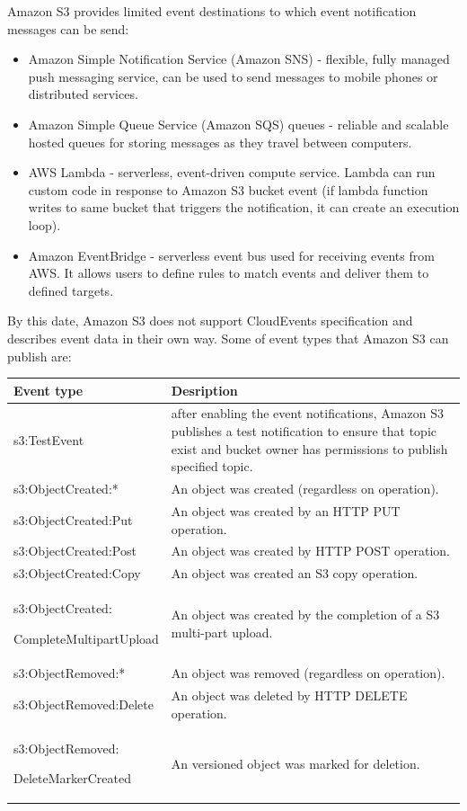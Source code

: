      Amazon S3 provides limited event destinations to which event notification messages can be send\cite{eventS3EventNotificationDest}:
     \begin{itemize}
         \item Amazon Simple Notification Service (Amazon SNS) - flexible, fully managed push messaging service, can be used to send messages to mobile phones or distributed services.
         \item Amazon Simple Queue Service (Amazon SQS) queues - reliable and scalable hosted queues for storing messages as they travel between computers.
         \item AWS Lambda - serverless, event-driven compute service. Lambda can run custom code in response to Amazon S3 bucket event (if lambda function writes to same bucket that triggers the notification, it can create an execution loop).
         \item Amazon EventBridge - serverless event bus used for receiving events from AWS. It allows users to define rules to match events and deliver them to defined targets.
     \end{itemize}

     By this date, Amazon S3 does not support CloudEvents specification and describes event data in their own way. Some of event types that Amazon S3 can publish are\cite{eventS3EventNotificationDest}:


     \renewcommand*{\arraystretch}{1.4}
     \begin{tabularx}{\textwidth}{|p{}|X|}
         \hline
         \textbf{Event type} & \textbf{Desription} \\
         \hline
         s3:TestEvent & after enabling the event notifications, Amazon S3 publishes a test notification to ensure that topic exist and bucket owner has permissions to publish specified topic. \\
         \hline
         s3:ObjectCreated:* & An object was created (regardless on operation). \\
         \hline
         s3:ObjectCreated:Put & An object was created by an HTTP PUT operation. \\
         \hline
         s3:ObjectCreated:Post & An object was created by HTTP POST operation. \\
         \hline
         s3:ObjectCreated:Copy & An object was created an S3 copy operation. \\
         \hline
         s3:ObjectCreated:

         CompleteMultipartUpload & An object was created by the completion of a S3 multi-part upload. \\
         \hline
         s3:ObjectRemoved:* & An object was removed (regardless on operation). \\
         \hline
         s3:ObjectRemoved:Delete & An object was deleted by HTTP DELETE operation. \\
         \hline
         s3:ObjectRemoved:

         DeleteMarkerCreated & An versioned object was marked for deletion. \\
         \hline
    \end{tabularx}


